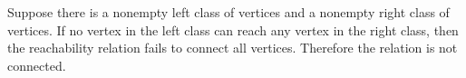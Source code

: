 Suppose there is a nonempty left class of vertices and a nonempty right class of vertices. If no vertex in the left class can reach any vertex in the right class, then the reachability relation fails to connect all vertices. Therefore the relation is not connected.
